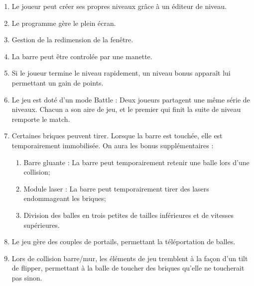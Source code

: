  \begin{enumerate}
    \item Le joueur peut créer ses propres niveaux grâce à un éditeur de niveau. 
    \item Le programme gère le plein écran.
    \item Gestion de la redimension de la fenêtre.
    \item La barre peut être controlée par une manette.
    \item Si le joueur termine le niveau rapidement, un niveau bonus apparaît lui permettant un gain de points.
    \item Le jeu est doté d'un mode Battle : Deux joueurs partagent une même série de niveaux. Chacun a son aire de jeu, et le premier qui finit la suite de niveau remporte le match.
    \item Certaines briques peuvent tirer. Lorsque la barre est touchée, elle est temporairement immobilisée.
On aura les bonus supplémentaires :
    \begin{enumerate}
      \item Barre gluante : La barre peut temporairement retenir une balle lors d'une collision;
      \item Module laser : La barre peut temporairement tirer des lasers endommageant les briques;
      \item Division des balles en trois petites de tailles inférieures et de vitesses supérieures.
    \end{enumerate}
    \item Le jeu gère des couples de portails, permettant la téléportation de balles.
    \item Lors de collision barre/mur, les éléments de jeu tremblent à la façon d'un tilt de flipper, permettant à la balle de toucher des briques qu'elle ne toucherait pas sinon.
  \end{enumerate}